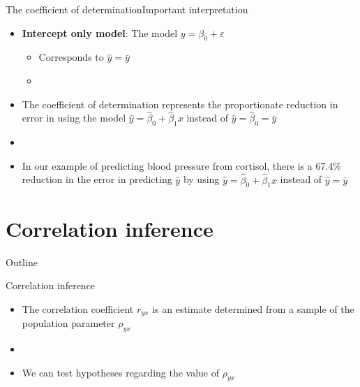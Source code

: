 \documentclass[xcolor=dvipsnames]{beamer}
\begin{document}
\begin{frame}{The coefficient of determination}{Important interpretation}
	\begin{itemize}
		\item \textbf{Intercept only model}: The model $y = \beta_0 + \varepsilon$
		\begin{itemize}
			\item Corresponds to $\hat{y} = \bar{y}$
			\item[]
		\end{itemize}
		\item The coefficient of determination represents the proportionate reduction in error in using the model $\hat{y}=\hat{\beta}_0 + \hat{\beta}_1 x$ instead of $\hat{y}=\hat{\beta}_0 =\bar{y}$
		\item[]
		\item In our example of predicting blood pressure from cortisol, there is a 67.4\% reduction in the error in predicting $\hat{y}$ by using $\hat{y}=\hat{\beta}_0 + \hat{\beta}_1 x$ instead of $\hat{y} = \bar{y}$
	\end{itemize}
\end{frame}


\section{Correlation inference}
\begin{frame}{Outline}
	\tableofcontents[currentsection,subsectionstyle=show/shaded/hide]
\end{frame}

\begin{frame}{Correlation inference}
	\begin{itemize}
		\item The correlation coefficient $r_{yx}$ is an estimate determined from a sample of the population parameter $\rho_{yx}$
		\item[]
		\item We can test hypotheses regarding the value of $\rho_{yx}$
	\end{itemize}
\end{frame}
\end{document}
